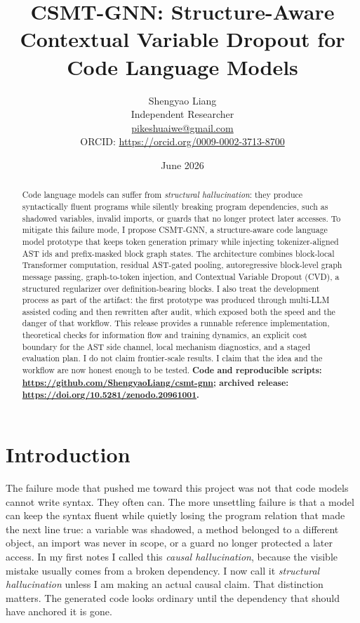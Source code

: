 \documentclass[10pt]{article}
\title{CSMT-GNN: Structure-Aware Contextual Variable Dropout for Code Language Models}
\author{
Shengyao Liang\\
Independent Researcher\\
\href{mailto:pikeshuaiwe@gmail.com}{pikeshuaiwe@gmail.com}\\
ORCID: \url{https://orcid.org/0009-0002-3713-8700}
}
\date{June 2026}
\begin{document}
\maketitle

\begin{abstract}
Code language models can suffer from \emph{structural hallucination}: they
produce syntactically fluent programs while silently breaking program
dependencies, such as shadowed variables, invalid imports, or guards that no
longer protect later accesses.  To mitigate this failure mode, I propose
CSMT-GNN, a structure-aware code language model prototype that keeps token
generation primary while injecting tokenizer-aligned AST ids and prefix-masked
block graph states.  The architecture combines block-local Transformer
computation, residual AST-gated pooling, autoregressive block-level graph
message passing, graph-to-token injection, and Contextual Variable Dropout
(CVD), a structured regularizer over definition-bearing blocks.  I also treat
the development process as part of the artifact: the first prototype was
produced through multi-LLM assisted coding and then rewritten after audit, which
exposed both the speed and the danger of that workflow.  This release provides a
runnable reference implementation, theoretical checks for information flow and
training dynamics, an explicit cost boundary for the AST side channel, local
mechanism diagnostics, and a staged evaluation plan.  I do not claim
frontier-scale results.  I claim that the idea and the workflow are now honest
enough to be tested.  \textbf{Code and reproducible scripts:
\href{https://github.com/ShengyaoLiang/csmt-gnn}{https://github.com/ShengyaoLiang/csmt-gnn};
archived release:
\href{https://doi.org/10.5281/zenodo.20961001}{https://doi.org/10.5281/zenodo.20961001}.}
\end{abstract}

\section{Introduction}

The failure mode that pushed me toward this project was not that code models
cannot write syntax.  They often can.  The more unsettling failure is that a
model can keep the syntax fluent while quietly losing the program relation that
made the next line true: a variable was shadowed, a method belonged to a
different object, an import was never in scope, or a guard no longer protected a
later access.  In my first notes I called this \emph{causal hallucination},
because the visible mistake usually comes from a broken dependency.  I now call
it \emph{structural hallucination} unless I am making an actual causal claim.
That distinction matters.  The generated code looks ordinary until the
dependency that should have anchored it is gone.
\end{document}
